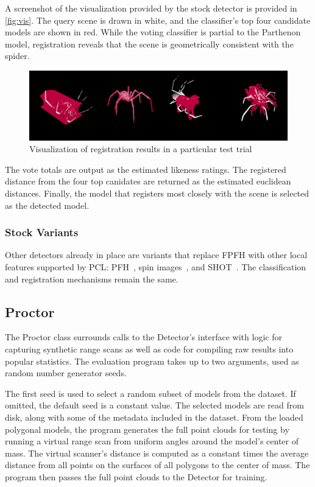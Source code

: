 A screenshot of the visualization provided by the stock detector is provided in \autoref{fig:vis}. The query scene is drawn in white, and the classifier's top four candidate models are shown in red. While the voting classifier is partial to the Parthenon model, registration reveals that the scene is geometrically consistent with the spider.
\begin{figure}[thpb]
  \centering
  \includegraphics[width=\columnwidth]{../figures/visualization.png}
  \caption{Visualization of registration results in a particular test trial}
  \label{fig:vis}
\end{figure}

The vote totals are output as the estimated likeness ratings.
The registered distance from the four top canidates are returned as the estimated euclidean distances.
Finally, the model that registers most closely with the scene is selected as the detected model.

\subsubsection{Stock Variants}
Other detectors already in place are variants that replace FPFH with other local features supported by PCL: PFH~\cite{pfh1, pfh2}, spin images~\cite{SpinImages}, and SHOT~\cite{shot}.
The classification and registration mechanisms remain the same.

\subsection{Proctor}
The Proctor class surrounds calls to the Detector's interface with logic for capturing synthetic range scans as well as code for compiling raw results into popular statistics.
The evaluation program takes up to two arguments, used as random number generator seeds.

The first seed is used to select a random subset of models from the dataset. If omitted, the default seed is a constant value.
The selected models are read from disk, along with some of the metadata included in the dataset.
From the loaded polygonal models, the program generates the full point clouds for testing by running a virtual range scan from uniform angles around the model's center of mass.
The virtual scanner's distance is computed as a constant times the average distance from all points on the surfaces of all polygons to the center of mass.
The program then passes the full point clouds to the Detector for training.

